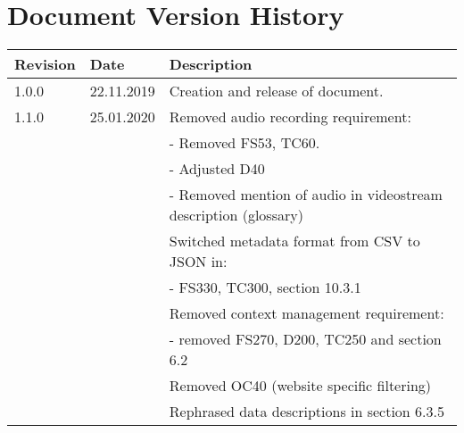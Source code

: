 \chapter*{Document Version History}
\label{ch:versionhistory}
\begin{table}[h]
\begin{tabular}{lll}
\textbf{Revision} & \textbf{Date} & \textbf{Description}              \\
\hline
1.0.0             & 22.11.2019    & Creation and release of document. \\
\hline
1.1.0             & 25.01.2020    & Removed audio recording requirement: \\
&& - Removed FS53, TC60. \\
&& - Adjusted D40 \\
&& - Removed mention of audio in \gls{videostream} description (glossary) \\
&& Switched metadata format from CSV to JSON in:\\
&& - FS330, TC300, section 10.3.1 \\
&& Removed context management requirement:\\
&& - removed FS270, D200, TC250 and section 6.2\\
&& Removed OC40 (website specific filtering)\\
&& Rephrased data descriptions in section 6.3.5\\
\end{tabular}
\end{table}